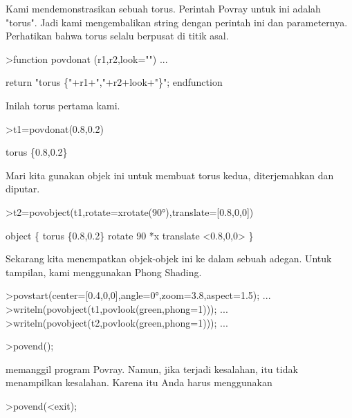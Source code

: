 \documentclass[a4paper,10pt]{article}
\begin{document}
\begin{eulernotebook}
\begin{eulercomment}
Kami mendemonstrasikan sebuah torus. Perintah Povray untuk ini adalah
"torus". Jadi kami mengembalikan string dengan perintah ini dan
parameternya. Perhatikan bahwa torus selalu berpusat di titik asal.
\end{eulercomment}
\begin{eulerprompt}
>function povdonat (r1,r2,look="") ...
\end{eulerprompt}
\begin{eulerudf}
    return "torus \{"+r1+","+r2+look+"\}";
  endfunction
\end{eulerudf}
\begin{eulercomment}
Inilah torus pertama kami.
\end{eulercomment}
\begin{eulerprompt}
>t1=povdonat(0.8,0.2)
\end{eulerprompt}
\begin{euleroutput}
  torus \{0.8,0.2\}
\end{euleroutput}
\begin{eulercomment}
Mari kita gunakan objek ini untuk membuat torus kedua, diterjemahkan
dan diputar.
\end{eulercomment}
\begin{eulerprompt}
>t2=povobject(t1,rotate=xrotate(90°),translate=[0.8,0,0])
\end{eulerprompt}
\begin{euleroutput}
  object \{ torus \{0.8,0.2\}
   rotate 90 *x 
   translate <0.8,0,0>
   \}
\end{euleroutput}
\begin{eulercomment}
Sekarang kita menempatkan objek-objek ini ke dalam sebuah adegan.
Untuk tampilan, kami menggunakan Phong Shading.
\end{eulercomment}
\begin{eulerprompt}
>povstart(center=[0.4,0,0],angle=0°,zoom=3.8,aspect=1.5); ...
>writeln(povobject(t1,povlook(green,phong=1))); ...
>writeln(povobject(t2,povlook(green,phong=1))); ...
\end{eulerprompt}
\begin{eulercomment}
\textgreater{}povend();

memanggil program Povray. Namun, jika terjadi kesalahan, itu tidak
menampilkan kesalahan. Karena itu Anda harus menggunakan

\end{eulercomment}
\begin{eulerttcomment}
 >povend(<exit);
\end{eulerttcomment}
\begin{eulercomment}


\end{eulercomment}
\end{eulernotebook}
\end{document}
